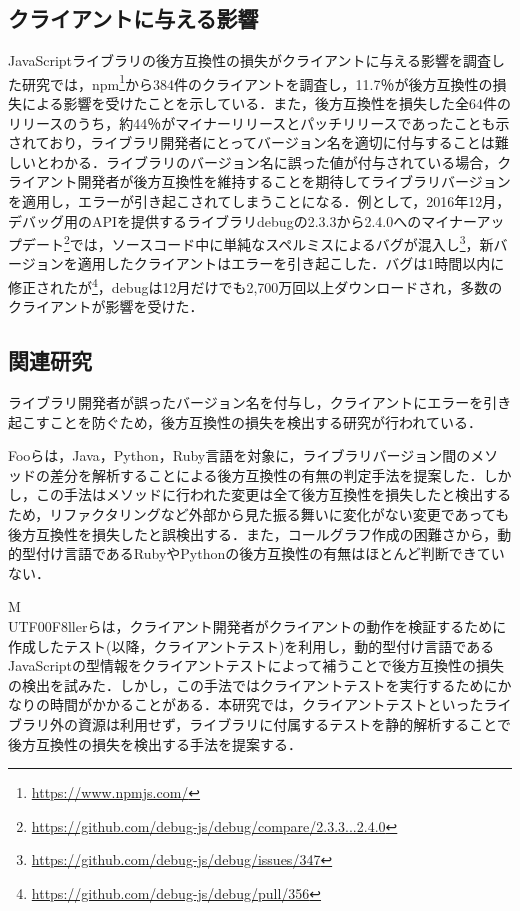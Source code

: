 \documentclass[submit]{ipsj}
\begin{document}
\subsection{クライアントに与える影響}
JavaScriptライブラリの後方互換性の損失がクライアントに与える影響を調査した研究\cite{impact-analysis-for-clients}では，npm\footnote{\url{https://www.npmjs.com/}}から384件のクライアントを調査し，11.7％が後方互換性の損失による影響を受けたことを示している．また，後方互換性を損失した全64件のリリースのうち，約44％がマイナーリリースとパッチリリースであったことも示されており，ライブラリ開発者にとってバージョン名を適切に付与することは難しいとわかる．ライブラリのバージョン名に誤った値が付与されている場合，クライアント開発者が後方互換性を維持することを期待してライブラリバージョンを適用し，エラーが引き起こされてしまうことになる．例として，2016年12月，デバッグ用のAPIを提供するライブラリdebugの2.3.3から2.4.0へのマイナーアップデート\footnote{\url{https://github.com/debug-js/debug/compare/2.3.3...2.4.0}}では，ソースコード中に単純なスペルミスによるバグが混入し\footnote{\url{https://github.com/debug-js/debug/issues/347}}，新バージョンを適用したクライアントはエラーを引き起こした．バグは1時間以内に修正されたが\footnote{\url{https://github.com/debug-js/debug/pull/356}}，debugは12月だけでも2,700万回以上ダウンロードされ，多数のクライアントが影響を受けた．

\subsection{関連研究}
ライブラリ開発者が誤ったバージョン名を付与し，クライアントにエラーを引き起こすことを防ぐため，後方互換性の損失を検出する研究が行われている．

Fooらは，Java，Python，Ruby言語を対象に，ライブラリバージョン間のメソッドの差分を解析することによる後方互換性の有無の判定手法を提案した\cite{foo}．しかし，この手法はメソッドに行われた変更は全て後方互換性を損失したと検出するため，リファクタリングなど外部から見た振る舞いに変化がない変更であっても後方互換性を損失したと誤検出する．また，コールグラフ作成の困難さから，動的型付け言語であるRubyやPythonの後方互換性の有無はほとんど判断できていない．

M\\UTF{00F8}llerらは，クライアント開発者がクライアントの動作を検証するために作成したテスト(以降，クライアントテスト)を利用し，動的型付け言語であるJavaScriptの型情報をクライアントテストによって補うことで後方互換性の損失の検出を試みた\cite{type-regression-testing}\cite{model-based-testing}．しかし，この手法ではクライアントテストを実行するためにかなりの時間がかかることがある．本研究では，クライアントテストといったライブラリ外の資源は利用せず，ライブラリに付属するテストを静的解析することで後方互換性の損失を検出する手法を提案する．
\end{document}
